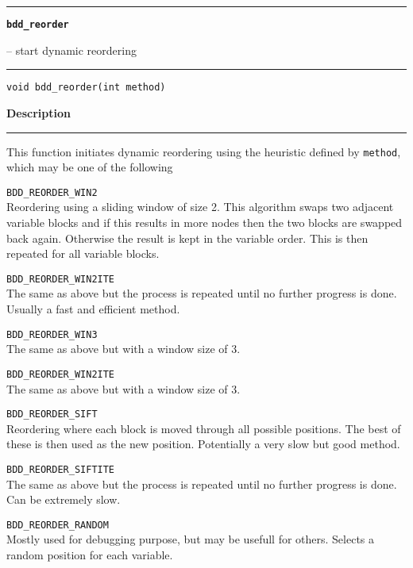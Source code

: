 \begin{minipage}{\textwidth}

\noindent\begin{minipage}{\textwidth}
\rule{\textwidth}{0.5mm}
{\tt\bf bdd\_reorder }
\--- start dynamic reordering  \hspace{\fill}
\\\rule[1.5ex]{\textwidth}{0.5mm}
\end{minipage}

\noindent\begin{verbatim}
void bdd_reorder(int method) 
\end{verbatim}

\vspace{\parsep}\noindent
{\bf Description}\\\rule[1.5ex]{\textwidth}{0.2mm}\vspace{-1.5ex}\setlength{\parindent}{1em}
This function initiates dynamic reordering using the heuristic
           defined by {\tt method}, which may be one of the following
	   \begin{description}
	     \item {\tt BDD\_REORDER\_WIN2}\\
	       Reordering using a sliding window of size 2. This algorithm
	       swaps two adjacent variable blocks and if this results in
	       more nodes then the two blocks are swapped back again.
	       Otherwise the result is kept in the variable order. This is
	       then repeated for all variable blocks.
	     \item {\tt BDD\_REORDER\_WIN2ITE}\\
	       The same as above but the process is repeated until no further
	       progress is done. Usually a fast and efficient method.
	     \item {\tt BDD\_REORDER\_WIN3}\\
	       The same as above but with a window size of 3.
	     \item {\tt BDD\_REORDER\_WIN2ITE}\\
	       The same as above but with a window size of 3.
	     \item {\tt BDD\_REORDER\_SIFT}\\
	       Reordering where each block is moved through all possible
	       positions. The best of these is then used as the new position.
	       Potentially a very slow but good method.
	     \item {\tt BDD\_REORDER\_SIFTITE}\\
	       The same as above but the process is repeated until no further
	       progress is done. Can be extremely slow.
	     \item {\tt BDD\_REORDER\_RANDOM}\\
	       Mostly used for debugging purpose, but may be usefull for
	       others. Selects a random position for each variable.
	   \end{description}
	   


\end{minipage}
